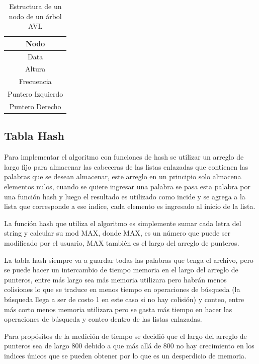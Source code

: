 \documentclass[12pt,letterpaper]{scrartcl}
\begin{document}
\begin{table}[!h]
\centering
\caption{Estructura de un nodo de un árbol AVL}
\label{table:nodo}
\begin{tabular}{|c|}
\hline 
\textbf{Nodo} \\ 
\hline 
Data \\ 
\hline
Altura\\ 
\hline
Frecuencia\\ 
\hline 
Puntero Izquierdo\\ 
\hline
Puntero Derecho\\ 
\hline
\end{tabular} 
\end{table}

\subsection{Tabla Hash}

Para implementar el algoritmo con funciones de hash se utilizar un arreglo de largo fijo para almacenar las cabeceras de las listas enlazadas que contienen las palabras que se desean almacenar, este arreglo en un principio solo almacena elementos nulos, cuando se quiere ingresar una palabra se pasa esta palabra por una función hash y luego el resultado es utilizado como incide y se agrega a la lista que corresponde a ese indice, cada elemento es ingresado al inicio de la lista.

La función hash que utiliza el algoritmo es simplemente sumar cada letra del string y calcular su mod MAX, donde MAX, es un número que puede ser modificado por el usuario, MAX también es el largo del arreglo de punteros.

La tabla hash siempre va a guardar todas las palabras que tenga el archivo, pero se puede hacer un intercambio de tiempo memoria en el largo del arreglo de punteros, entre más largo sea más memoria utilizara pero habrán menos colisiones lo que se traduce en menos tiempo en operaciones de búsqueda (la búsqueda llega a ser de costo 1 en este caso si no hay colisión) y conteo, entre más corto menos memoria utilizara pero se gasta más tiempo en hacer las operaciones de búsqueda y conteo dentro de las listas enlazadas.

Para propósitos de la medición de tiempo se decidió que el largo del arreglo de punteros sea de largo 800 debido a que más allá de 800 no hay crecimiento en los indices únicos que se pueden obtener por lo que es un desperdicio de memoria.
\end{document}
